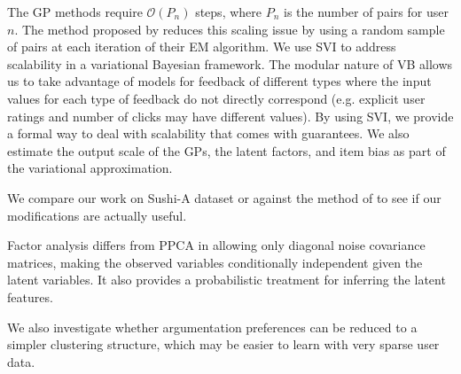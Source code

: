 The GP methods require $\mathcal{O}(P_n)$ steps, where $P_n$ is the number of pairs for 
user $n$. 
The method proposed by \cite{khan2014scalable} reduces this scaling issue by using a random sample of pairs at each iteration of their EM algorithm.
We use SVI to address scalability in a variational Bayesian framework. 
The modular nature of VB allows us to take advantage of models for feedback of different types
where the input values for each type of feedback do not directly correspond (e.g. explicit user ratings and number of clicks may have different values).
By using SVI, we provide a formal way to deal with scalability that comes with guarantees\cite{SVI paper}.
We also estimate the output scale of the GPs, the latent factors, and item bias as part of the 
variational approximation. %


We compare our work on Sushi-A dataset or against the method of \cite{khan14scalable} to see if 
our modifications are actually useful. 

Factor analysis differs from PPCA in allowing only diagonal noise covariance matrices, making 
the observed variables conditionally independent given the latent variables. It also provides
a probabilistic treatment for inferring the latent features. %

We also investigate whether argumentation preferences can be reduced to a simpler
clustering structure, which may be easier to learn with very sparse user data.

